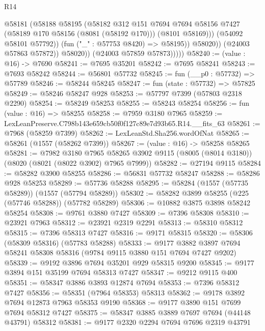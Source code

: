 \begin{lexlean}{R14}
\begin{coremodule}
                        @58181
                          (@58188
                            @58195
                            (@58182
                              @312
                              @151
                              @7694
                              @7694
                              @58156
                              @7427
                              (@58189 @170 @58156 (@8081 (@58192 @170)))
                              (@8101 @58169)))
                          (@54092 @58101 @57792))
                        (fun ("_" : @57753 @8420) => @58195))
                      @58020))
                  (@24003 @57863 @57872))
                @58020))
            (@24003 @57859 @57873)))))
@58240 := (value : @16) -> @7690
@58241 := @7695 @35201
@58242 := @7695 @58241
@58243 := @7693 @58242
@58244 := @56801 @57732
@58245 := fun (__p0 : @57732) => @57789
@58246 := @58244 @58245
@58247 := fun (state : @57732) => @57825
@58249 := @58246 @58247 @928
@58253 := @57797 @7399 (@57803 @2318 @2290)
@58254 := @58249 @58253
@58255 := @58243 @58254
@58256 := fun (value : @16) => @58255
@58258 := @7959 @3180 @7965
@58259 := LexLeanPreserve.C798b143e659cb50f0f127c89e7d93b65.R14.__fits_63
@58261 := @7968 (@58259 @7399)
@58262 := LexLeanStd.Sha256.wordOfNat
@58265 := @58261 (@1557 (@58262 @7399))
@58267 := (value : @16) -> @58258 @58265
@58281 := @7982
    @3180
    @7965
    @58265
    @3902
    @9115
    (@8005 (@8014 @3180))
    (@8020 (@8021 (@8022 @3902) @7965 @7999))
@58282 := @27194 @9115
@58284 := @58282 @3900 @58255
@58286 := @56831 @57732 @58247
@58288 := @58286 @928 @58253
@58289 := @57736 @58288
@58295 := @58284 (@1557 (@57735 @58289)) (@1557 (@57794 @58289))
@58302 := @58282 @3899 @58255 (@225 (@57746 @58288)) (@57782 @58289)
@58306 := @10882 @3875 @3898 @58242 @58254
@58308 := @9761 @3880 @7427
@58309 := @7396 @58308
@58310 := @23921 @7963
@58312 := @23921 @2319 @2291
@58313 := @58310 @58312
@58315 := @7396 @58313 @7427
@58316 := @9171 @58315
@58320 := @58306 (@58309 @58316) (@57783 @58288)
@58333 := @9177 @3882 @3897 @7694 @58241 @58308 @58316 (@9784 @9115 @3880 @151 @7694 @7427 @9202)
@58339 := @9192 @3896 @7694 @35201 @929 @58315 @9200
@58345 := @9177 @3894 @151 @35199 @7694 @58313 @7427
@58347 := @9212 @9115 @400
@58351 := @58347 @3886 @3893 @12874 @7694
@58353 := @7396 @58312 @7427
@58356 := @58351 (@7964 @58353) @58313
@58362 := @9178 @3892 @7694 @12873 @7963 @58353 @9190
@58368 := @9177 @3890 @151 @7699 @7694 @58312 @7427
@58375 := @58347 @3885 @3889 @7697 @7694 (@44148 @43791) @58312
@58381 := @9177 @2320 @2294 @7694 @7696 @2319 @43791

\end{coremodule}
\end{lexlean}
